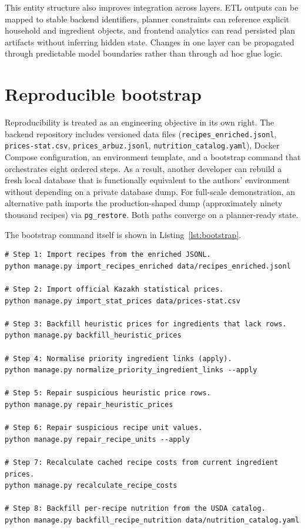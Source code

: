 This entity structure also improves integration across layers. ETL outputs can be mapped to stable backend identifiers, planner constraints can reference explicit household and ingredient objects, and frontend analytics can read persisted plan artifacts without inferring hidden state. Changes in one layer can be propagated through predictable model boundaries rather than through ad hoc glue logic.

\section{Reproducible bootstrap}

Reproducibility is treated as an engineering objective in its own right. The backend repository includes versioned data files (\texttt{recipes\_enriched.jsonl}, \texttt{prices-stat.csv}, \texttt{prices\_arbuz.jsonl}, \texttt{nutrition\_catalog.yaml}), Docker Compose configuration, an environment template, and a bootstrap command that orchestrates eight ordered steps. As a result, another developer can rebuild a fresh local database that is functionally equivalent to the authors' environment without depending on a private database dump. For full-scale demonstration, an alternative path imports the production-shaped dump (approximately ninety thousand recipes) via \texttt{pg\_restore}. Both paths converge on a planner-ready state.

The bootstrap command itself is shown in Listing~\ref{lst:bootstrap}.

\begin{lstlisting}[caption={Eight-step bootstrap orchestrated by \texttt{bootstrap\_demo\_data}.},label={lst:bootstrap}]
# Step 1: Import recipes from the enriched JSONL.
python manage.py import_recipes_enriched data/recipes_enriched.jsonl

# Step 2: Import official Kazakh statistical prices.
python manage.py import_stat_prices data/prices-stat.csv

# Step 3: Backfill heuristic prices for ingredients that lack rows.
python manage.py backfill_heuristic_prices

# Step 4: Normalise priority ingredient links (apply).
python manage.py normalize_priority_ingredient_links --apply

# Step 5: Repair suspicious heuristic price rows.
python manage.py repair_heuristic_prices

# Step 6: Repair suspicious recipe unit values.
python manage.py repair_recipe_units --apply

# Step 7: Recalculate cached recipe costs from current ingredient prices.
python manage.py recalculate_recipe_costs

# Step 8: Backfill per-recipe nutrition from the USDA catalog.
python manage.py backfill_recipe_nutrition data/nutrition_catalog.yaml
\end{lstlisting}

